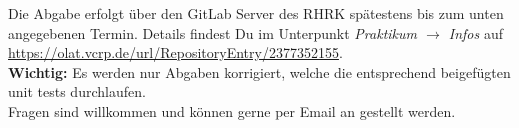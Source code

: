 Die Abgabe erfolgt über den GitLab Server des RHRK spätestens bis zum unten angegebenen Termin. Details findest Du im Unterpunkt \emph{Praktikum
$\rightarrow $ Infos} auf \url{https://olat.vcrp.de/url/RepositoryEntry/2377352155}.\\

\textbf{Wichtig:} Es werden nur Abgaben korrigiert, welche die entsprechend beigefügten unit tests
durchlaufen.\\

Fragen sind willkommen und können gerne per Email an  gestellt werden. 

